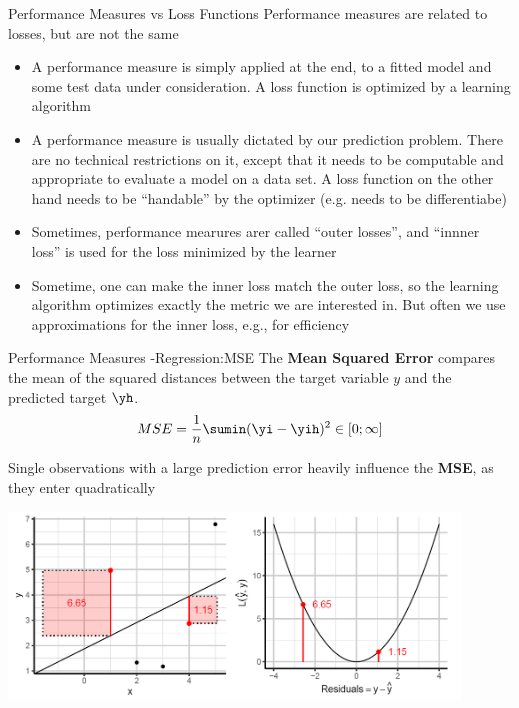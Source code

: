 \begin{frame}{Performance Measures vs Loss Functions}
Performance measures are related to losses, but are not the same
\begin{itemize}
\item A performance measure is simply applied at the end, to a fitted model and some test data under consideration. A loss function is optimized by a learning algorithm
\item A performance measure is usually dictated by our prediction problem. There are no technical restrictions on it, except that it needs to be computable and appropriate to evaluate a model on a data set.
A loss function on the other hand needs to be \enquote{handable} by the optimizer (e.g. needs to be differentiabe)
\item Sometimes, performance mearures arer called \enquote{outer losses}, and \enquote{innner loss} is used for the loss minimized by the learner
\item Sometime, one can make the inner loss match the outer loss, so the learning algorithm optimizes exactly the metric we are interested in. But often we use approximations for the inner loss, e.g., for efficiency
\end{itemize}
\end{frame}


\begin{frame}{Performance Measures -Regression:MSE}
The \textbf{Mean Squared Error} compares the mean of the squared
distances between the target variable \(y\) and the predicted target
\(\yh\). \[
MSE = \frac{1}{n} \sumin (\yi - \yih)^2 \in [0;\infty]
\]

Single observations with a large prediction error heavily influence the
\textbf{MSE}, as they enter quadratically

\scriptsize
\begin{center}
\includegraphics[width=0.9\textwidth]{plots/MSE.png}
\end{center}
\normalsize 
\end{frame}


